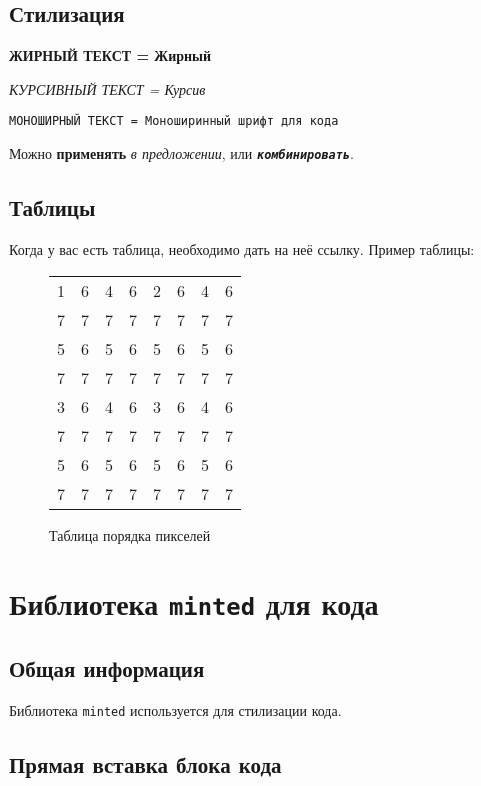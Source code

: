 \documentclass[a4paper,12pt]{report}
\begin{document}
\subsection{Стилизация}

\textbf{ЖИРНЫЙ ТЕКСТ = Жирный}

\textit{КУРСИВНЫЙ ТЕКСТ = Курсив}

\texttt{МОНОШИРНЫЙ ТЕКСТ = Моноширинный шрифт для кода}

Можно \textbf{применять} \textit{в предложении}, или \texttt{\textit{\textbf{комбинировать}}}.

\subsection{Таблицы}

Когда у вас есть таблица, необходимо дать на неё ссылку.
Пример таблицы:

\begin{figure}[!ht]
\centering
\begin{tabular}{c c c c c c c c}
    1 & 6 & 4 & 6 & 2 & 6 & 4 & 6 \\
    7 & 7 & 7 & 7 & 7 & 7 & 7 & 7 \\
    5 & 6 & 5 & 6 & 5 & 6 & 5 & 6 \\
    7 & 7 & 7 & 7 & 7 & 7 & 7 & 7 \\
    3 & 6 & 4 & 6 & 3 & 6 & 4 & 6 \\
    7 & 7 & 7 & 7 & 7 & 7 & 7 & 7 \\
    5 & 6 & 5 & 6 & 5 & 6 & 5 & 6 \\
    7 & 7 & 7 & 7 & 7 & 7 & 7 & 7 \\
\end{tabular}
\caption{Таблица порядка пикселей}
\label{fig:pixel_order_table}
\end{figure}

\section{Библиотека \texttt{minted} для кода}

\subsection{Общая информация}

Библиотека \texttt{minted} используется для стилизации кода.

\subsection{Прямая вставка блока кода}
\end{document}
